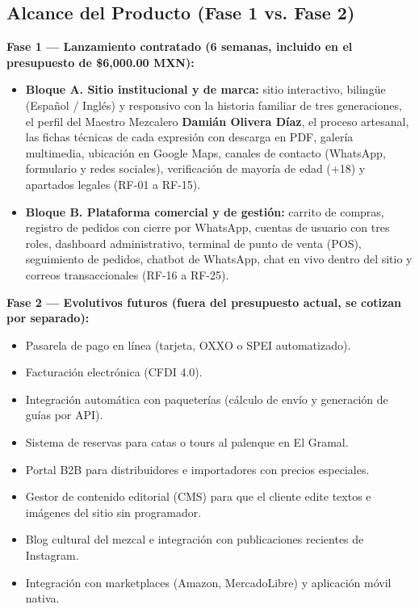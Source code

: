 \documentclass[11pt,letterpaper]{article}
\begin{document}
\subsection{Alcance del Producto (Fase 1 vs. Fase 2)}

\textbf{Fase 1 — Lanzamiento contratado (6 semanas, incluido en el presupuesto de \$6,000.00 MXN):}
\begin{itemize}[leftmargin=1.5em]
    \item \textbf{Bloque A. Sitio institucional y de marca:} sitio interactivo, bilingüe (Español / Inglés) y responsivo con la historia familiar de tres generaciones, el perfil del Maestro Mezcalero \textbf{Damián Olivera Díaz}, el proceso artesanal, las fichas técnicas de cada expresión con descarga en PDF, galería multimedia, ubicación en Google Maps, canales de contacto (WhatsApp, formulario y redes sociales), verificación de mayoría de edad (+18) y apartados legales (RF-01 a RF-15).
    \item \textbf{Bloque B. Plataforma comercial y de gestión:} carrito de compras, registro de pedidos con cierre por WhatsApp, cuentas de usuario con tres roles, dashboard administrativo, terminal de punto de venta (POS), seguimiento de pedidos, chatbot de WhatsApp, chat en vivo dentro del sitio y correos transaccionales (RF-16 a RF-25).
\end{itemize}

\textbf{Fase 2 — Evolutivos futuros (fuera del presupuesto actual, se cotizan por separado):}
\begin{itemize}[leftmargin=1.5em]
    \item Pasarela de pago en línea (tarjeta, OXXO o SPEI automatizado).
    \item Facturación electrónica (CFDI 4.0).
    \item Integración automática con paqueterías (cálculo de envío y generación de guías por API).
    \item Sistema de reservas para catas o tours al palenque en El Gramal.
    \item Portal B2B para distribuidores e importadores con precios especiales.
    \item Gestor de contenido editorial (CMS) para que el cliente edite textos e imágenes del sitio sin programador.
    \item Blog cultural del mezcal e integración con publicaciones recientes de Instagram.
    \item Integración con marketplaces (Amazon, MercadoLibre) y aplicación móvil nativa.
\end{itemize}
\end{document}
